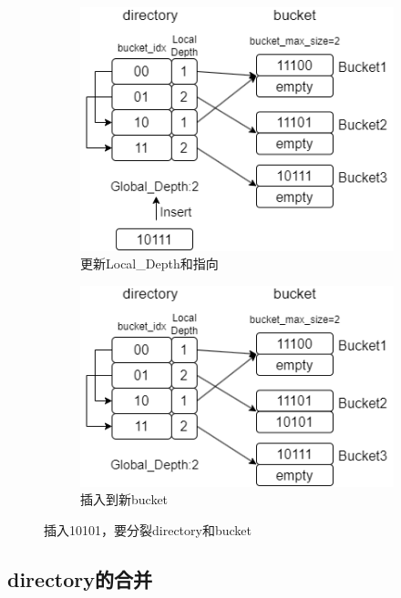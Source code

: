 \documentclass[a4paper]{article}
\begin{document}
\begin{figure}[h!]
\begin{minipage}[b]{0.4\linewidth}
\begin{subfigure}{}
       \includegraphics[width=\linewidth]{11.png}
       \caption{更新Local\_Depth和指向}
     \end{subfigure}
     \vfill
     \begin{subfigure}{}
       \includegraphics[width=\linewidth]{12.png}
       \caption{插入到新bucket}
     \end{subfigure}
   \end{minipage}
   \caption{插入10101，要分裂directory和bucket}
 \end{figure}



\subsection{directory的合并}
\end{document}
